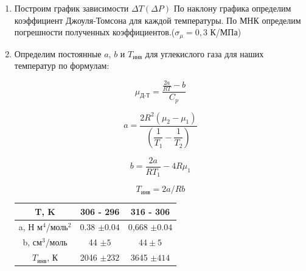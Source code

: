 \documentclass[a4paper, 12pt]{article}%
\begin{document}
\begin{enumerate}
\newpage

	\item Построим график зависимости $\Delta T (\Delta P)$ По наклону графика определим коэффициент Джоуля-Томсона для каждой температуры. По МНК определим погрешности полученных коэффициентов.($\sigma_{\mu} = 0,3$ К/МПа)
	
		\begin{figure}[h!]
	\end{figure}
	
	
	\item Определим постоянные $a$, $b$ и $T_{\text{инв}}$ для углекислого газа для наших температур по формулам: 
	
	$$\mu_{\text{Д-Т}} =  \dfrac{\frac{2a}{RT}-b}{C_p}$$ 
	
	$$a = \dfrac{2R^2(\mu_2 - \mu_1)}{ \left( \dfrac{1}{T_1} - \dfrac{1}{T_2} \right)}  $$
	
	$$ b = \dfrac{2a}{RT_1} - 4R \mu_1  $$
	
	$$ T_{\text{инв}} = 2a/Rb $$
	\begin{longtable}{|c|c|c|}
		\hline
		T, K & 306 - 296 & 316 - 306\\
		\hline
		a, Н м$^4$/моль$^2$ & 0.38 $\pm 0.04$& 0,668 $\pm 0.04$\\
		\hline
		b, см$^3$/моль & 44 $\pm 5$& $ 44\pm 5$\\
		\hline
		$T_{\text{инв}}$, К& 2046 $\pm 232$& 3645 $\pm 414$\\
		\hline
	\end{longtable}

\newpage

	\end{enumerate}
\end{document}
